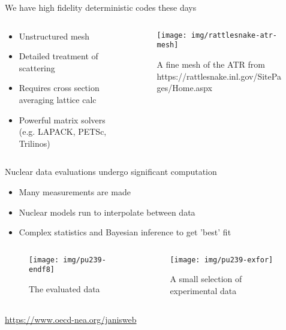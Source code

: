 \documentclass[pdf,aspectratio=169]{beamer}
\begin{document}
\begin{frame}{We have high fidelity deterministic codes these days}
\begin{columns}
    \begin{column}{0.5\textwidth}
        \begin{itemize}
            \item Unstructured mesh
            \item Detailed treatment of scattering
            \item Requires cross section averaging lattice calc
            \item Powerful matrix solvers (e.g. LAPACK, PETSc, Trilinos)
        \end{itemize}
    \end{column}
    \begin{column}{0.5\textwidth}
        \begin{figure}[ht]
        \centering
            \texttt{[image: img/rattlesnake-atr-mesh]}
        \caption{\small A fine mesh of the ATR from
            https://rattlesnake.inl.gov/SitePages/Home.aspx}
        \end{figure}
    \end{column}
\end{columns}
\end{frame}

\begin{frame}{Nuclear data evaluations undergo significant computation}
        \begin{itemize}
            \item Many measurements are made
            \item Nuclear models run to interpolate between data
            \item Complex statistics and Bayesian inference to get 'best' fit
        \end{itemize}
\begin{columns}
    \begin{column}{0.5\textwidth}
        \begin{figure}[ht]
        \centering
        \texttt{[image: img/pu239-endf8]}
        \caption{\small The evaluated data}
        \end{figure}
    \end{column}
    \begin{column}{0.5\textwidth}
        \begin{figure}[ht]
        \centering
            \texttt{[image: img/pu239-exfor]}
        \caption{\small A small selection of experimental data}
        \end{figure}
    \end{column}
\end{columns}
    \centering \tiny \url{https://www.oecd-nea.org/janisweb}
\end{frame}
\end{document}
